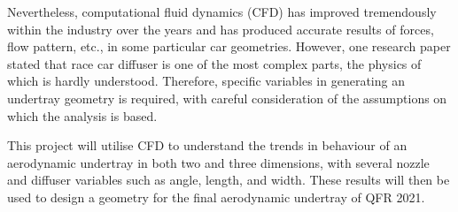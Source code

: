 \noindent Nevertheless, computational fluid dynamics (CFD) has improved tremendously within the industry over the years and has produced accurate results of forces, flow pattern, etc., in some particular car geometries. However, one research paper \cite{Zhang2006GroundCars} stated that race car diffuser is one of the most complex parts, the physics of which is hardly understood. Therefore, specific variables in generating an undertray geometry is required, with careful consideration of the assumptions on which the analysis is based.

\noindent This project will utilise CFD to understand the trends in behaviour of an aerodynamic undertray in both two and three dimensions, with several nozzle and diffuser variables such as angle, length, and width. These results will then be used to design a geometry for the final aerodynamic undertray of QFR 2021.

